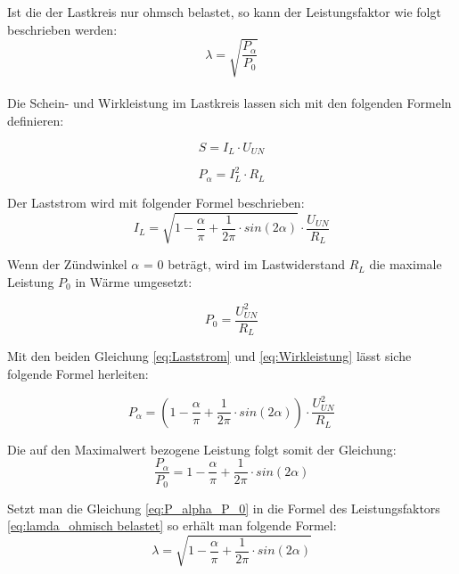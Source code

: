 Ist die der Lastkreis nur ohmsch belastet, so kann der Leistungsfaktor wie folgt beschrieben werden:
\begin{equation}\label{eq:lamda_ohmisch belastet}
\lambda =\sqrt{\frac{P_{\alpha}}{P_{0}}} 
\end{equation}
\\
Die Schein- und Wirkleistung im Lastkreis lassen sich mit den folgenden Formeln definieren:

\begin{equation}\label{eq:Scheinleistung}
S = I_L \cdot U_{UN}   
\end{equation}

\begin{equation}\label{eq:Wirkleistung}
 P_{\alpha} = I_L^2 \cdot R_L    
\end{equation}

Der Laststrom wird mit folgender Formel beschrieben:
\begin{equation}\label{eq:Laststrom}
I_L = \sqrt{1-\frac{\alpha}{\pi}+\frac{1}{2\pi} \cdot sin(2\alpha)} \cdot \frac{U_{UN}}{R_L}
\end{equation}

Wenn der Zündwinkel $\alpha$ = 0 beträgt, wird im Lastwiderstand $R_L$ die maximale Leistung $P_0$ in Wärme umgesetzt:

\begin{equation}\label{eq:Wirkleistung_bei_maximaler_alpha=0}
P_{0} = \frac{ U_{UN}^2}{R_L}  
\end{equation}

Mit den beiden Gleichung \ref{eq:Laststrom} und \ref{eq:Wirkleistung} lässt siche folgende Formel herleiten:

\begin{equation}\label{eq:p_alpha_neu}
P_{\alpha} = \left(1-\frac{\alpha}{\pi}+\frac{1}{2\pi} \cdot sin(2\alpha)\right)  \cdot \frac{U_{UN}^2}{R_L}
\end{equation}
 

Die auf den Maximalwert bezogene Leistung folgt somit der Gleichung:
\begin{equation}\label{eq:P_alpha_P_0}
\frac{P_{\alpha}}{P_0} = 1-\frac{\alpha}{\pi}+\frac{1}{2\pi} \cdot sin(2\alpha) 
\end{equation}

Setzt man die Gleichung \ref{eq:P_alpha_P_0} in die Formel des Leistungsfaktors \ref{eq:lamda_ohmisch belastet} so erhält man folgende Formel:
\begin{equation}\label{eq:lamda_p_n}
\lambda = \sqrt{1-\frac{\alpha}{\pi}+\frac{1}{2\pi} \cdot sin(2\alpha)}
\end{equation}

